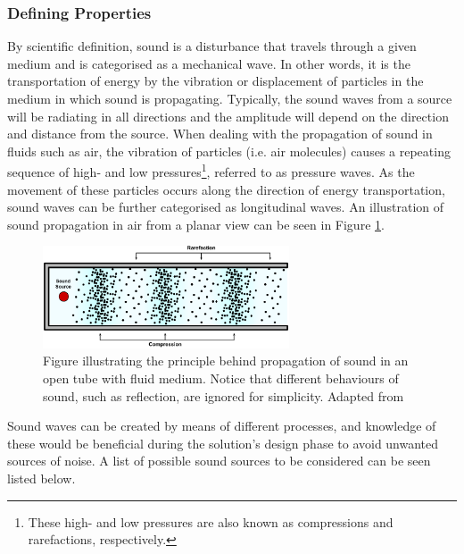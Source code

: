 \subsubsection{Defining Properties}
By scientific definition, sound is a disturbance that travels through a given medium and is categorised as a mechanical wave. In other words, it is the transportation of energy by the vibration or displacement of particles in the medium in which sound is propagating. Typically, the sound waves from a source will be radiating in all directions and the amplitude will depend on the direction and distance from the source. When dealing with the propagation of sound in fluids such as air, the vibration of particles (i.e. air molecules) causes a repeating sequence of high- and low pressures\footnote{These high- and low pressures are also known as compressions and rarefactions, respectively.}, referred to as pressure waves. As the movement of these particles occurs along the direction of energy transportation, sound waves can be further categorised as longitudinal waves. An illustration of sound propagation in air from a planar view can be seen in Figure \ref{Sound:sound_propagation}. \cite{Acoustics:Definition_of_sound1, Acoustics:Definition_of_sound2} 

\begin{figure}[H]
    \centering
    \includegraphics[width=0.65\textwidth]{figures/1Problem_analysis/Planar sound waves.pdf}
    \caption{Figure illustrating the principle behind propagation of sound in an open tube with fluid medium. Notice that different behaviours of sound, such as reflection, are ignored for simplicity. Adapted from \cite{Acoustics:Definition_of_sound1,Acoustics:Handbook_of_Acoustics}}
    \label{Sound:sound_propagation}
\end{figure}


Sound waves can be created by means of different processes, and knowledge of these would be beneficial during the solution's design phase to avoid unwanted sources of noise. A list of possible sound sources to be considered can be seen listed below. \cite{Acoustics:Handbook_of_Acoustics}

